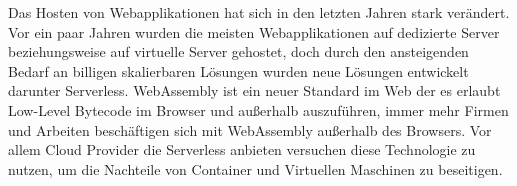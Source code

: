 Das Hosten von Webapplikationen hat sich in den letzten Jahren stark verändert. Vor ein paar Jahren wurden die meisten Webapplikationen auf dedizierte Server beziehungsweise auf virtuelle Server gehostet, doch durch den ansteigenden Bedarf an billigen skalierbaren Lösungen wurden neue Lösungen entwickelt darunter Serverless. WebAssembly ist ein neuer Standard im Web der es erlaubt Low-Level Bytecode im Browser und außerhalb auszuführen, immer mehr Firmen und Arbeiten beschäftigen sich mit WebAssembly außerhalb des Browsers. Vor allem Cloud Provider die Serverless anbieten versuchen diese Technologie zu nutzen, um die Nachteile von Container und Virtuellen Maschinen zu beseitigen.